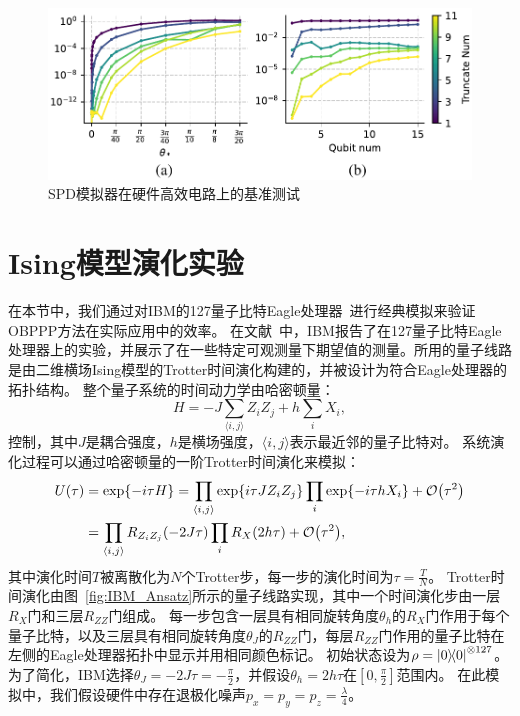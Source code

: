 \begin{figure}[!ht]
    \centering
\includegraphics[width=\textwidth]{figures/SPD_benchmark.pdf}
    \caption{SPD模拟器在硬件高效电路上的基准测试}
\label{fig:bench_mini_AQC}
\end{figure}

\section{Ising模型演化实验}



在本节中，我们通过对IBM的127量子比特Eagle处理器~\cite{kim2023evidence}进行经典模拟来验证OBPPP方法在实际应用中的效率。
在文献~\cite{kim2023evidence}中，IBM报告了在127量子比特Eagle处理器上的实验，并展示了在一些特定可观测量下期望值的测量。所用的量子线路是由二维横场Ising模型的Trotter时间演化构建的，并被设计为符合Eagle处理器的拓扑结构。
整个量子系统的时间动力学由哈密顿量：
\begin{equation}
  H=-J\sum_{\langle i,j\rangle} Z_iZ_j+h\sum_i X_i,
\end{equation}
控制，其中$J$是耦合强度，$h$是横场强度，$\langle i,j\rangle$表示最近邻的量子比特对。
系统演化过程可以通过哈密顿量的一阶Trotter时间演化来模拟：
\begin{equation}
    \begin{aligned}
        U(\tau)&=\exp{-i\tau H}=\prod_{\langle i,j\rangle} \exp{i\tau J Z_iZ_j}\prod_i \exp{-i\tau h X_i}+\order{\tau^2}\\
        &=\prod_{\langle i,j\rangle}R_{Z_iZ_j}(-2J\tau) \prod_i R_X(2h\tau)+\order{\tau^2},
    \end{aligned}
\end{equation}
其中演化时间$T$被离散化为$N$个Trotter步，每一步的演化时间为$\tau = \frac{T}{N}$。
Trotter时间演化由图~\ref{fig:IBM_Ansatz}所示的量子线路实现，其中一个时间演化步由一层$R_X$门和三层$R_{ZZ}$门组成。
每一步包含一层具有相同旋转角度$\theta_h$的$R_X$门作用于每个量子比特，以及三层具有相同旋转角度$\theta_J$的$R_{ZZ}$门，每层$R_{ZZ}$门作用的量子比特在左侧的Eagle处理器拓扑中显示并用相同颜色标记。
初始状态设为$\rho=\ketbra{0}{0}^{\otimes 127}$。
为了简化，IBM选择$\theta_J=-2J\tau=-\frac{\pi}{2}$，并假设$\theta_h=2h\tau$在$[0,\frac{\pi}{2}]$范围内。
在此模拟中，我们假设硬件中存在退极化噪声$p_x = p_y = p_z = \frac{\lambda}{4}$。

